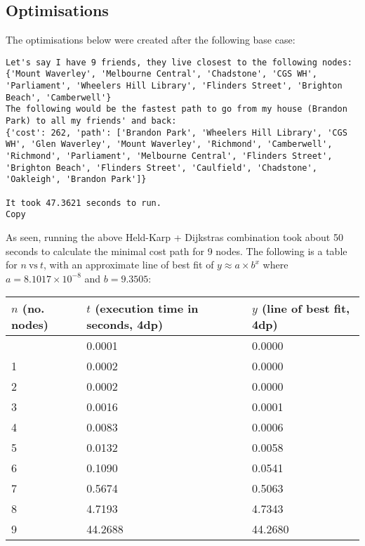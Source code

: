 \documentclass[
]{article}
\begin{document}
\hypertarget{optimisations}{%
\subsection{Optimisations}\label{optimisations}}

The optimisations below were created after the following base case:

\begin{verbatim}
Let's say I have 9 friends, they live closest to the following nodes: {'Mount Waverley', 'Melbourne Central', 'Chadstone', 'CGS WH', 'Parliament', 'Wheelers Hill Library', 'Flinders Street', 'Brighton Beach', 'Camberwell'}
The following would be the fastest path to go from my house (Brandon Park) to all my friends' and back:
{'cost': 262, 'path': ['Brandon Park', 'Wheelers Hill Library', 'CGS WH', 'Glen Waverley', 'Mount Waverley', 'Richmond', 'Camberwell', 'Richmond', 'Parliament', 'Melbourne Central', 'Flinders Street', 'Brighton Beach', 'Flinders Street', 'Caulfield', 'Chadstone', 'Oakleigh', 'Brandon Park']}

It took 47.3621 seconds to run.
Copy
\end{verbatim}

As seen, running the above Held-Karp + Dijkstra\textquotesingle s
combination took about 50 seconds to calculate the minimal cost path for
9 nodes. The following is a table for {\(n\ \text{vs}\ t\)}, with an
approximate line of best fit of {\(y \approx a \times b^{x}\)} where
{\(a = 8.1017 \times 10^{- 8}\)} and {\(b = 9.3505\)}:

\begin{longtable}[]{@{}lll@{}}
\toprule\noalign{}
{\(n\)} (no. nodes) & {\(t\)} (execution time in seconds, 4dp) & {\(y\)}
(line of best fit, 4dp) \\
\midrule\noalign{}
\endhead
\bottomrule\noalign{}
\endlastfoot
0 & 0.0001 & 0.0000 \\
1 & 0.0002 & 0.0000 \\
2 & 0.0002 & 0.0000 \\
3 & 0.0016 & 0.0001 \\
4 & 0.0083 & 0.0006 \\
5 & 0.0132 & 0.0058 \\
6 & 0.1090 & 0.0541 \\
7 & 0.5674 & 0.5063 \\
8 & 4.7193 & 4.7343 \\
9 & 44.2688 & 44.2680 \\
\end{longtable}
\end{document}
